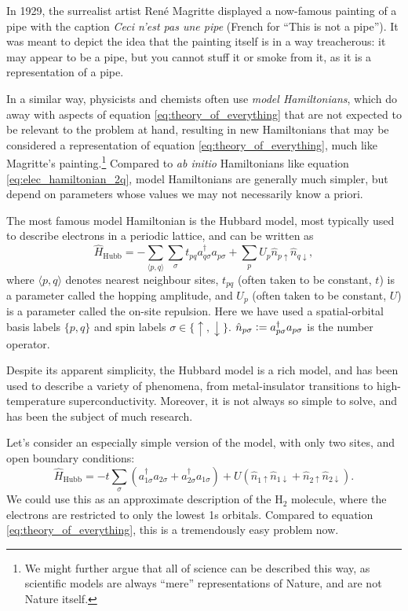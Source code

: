 In 1929, the surrealist artist Ren\'e Magritte displayed a now-famous painting of a pipe with the caption \emph{Ceci n'est pas une pipe} (French for ``This is not a pipe''). It was meant to depict the idea that the painting itself is in a way treacherous: it may appear to be a pipe, but you cannot stuff it or smoke from it, as it is a representation of a pipe.

In a similar way, physicists and chemists often use \emph{model Hamiltonians}, which do away with aspects of equation \ref{eq:theory_of_everything} that are not expected to be relevant to the problem at hand, resulting in new Hamiltonians that may be considered a representation of equation \ref{eq:theory_of_everything}, much like Magritte's painting.\footnote{We might further argue that all of science can be described this way, as scientific models are always ``mere'' representations of Nature, and are not Nature itself.} Compared to \emph{ab initio} Hamiltonians like equation \ref{eq:elec_hamiltonian_2q}, model Hamiltonians are generally much simpler, but depend on parameters whose values we may not necessarily know a priori.

The most famous model Hamiltonian is the Hubbard model,\cite{Hubbard1963} most typically used to describe electrons in a periodic lattice, and can be written as
\begin{equation}
\label{eq:hubbard}
\hat H_\mathrm{Hubb} = - \sum_{\langle p,q\rangle}\sum_\sigma t_{pq} a_{q\sigma}^\dag a_{p\sigma} + \sum_p U_p\hat n_{p\uparrow}\hat n_{q\downarrow},
\end{equation}
where $\langle p,q\rangle$ denotes nearest neighbour sites, $t_{pq}$ (often taken to be constant, $t$) is a parameter called the hopping amplitude, and $U_p$ (often taken to be constant, $U$) is a parameter called the on-site repulsion. Here we have used a spatial-orbital basis labels $\{p,q\}$ and spin labels $\sigma\in\{\uparrow,\downarrow\}$. $\hat n_{p\sigma}\mathrel{\mathop:}= a_{p\sigma}^\dag a_{p\sigma}$ is the number operator.

Despite its apparent simplicity, the Hubbard model is a rich model, and has been used to describe a variety of phenomena, from metal-insulator transitions to high-temperature superconductivity. Moreover, it is not always so simple to solve, and has been the subject of much research.\cite{Lieb1968a,liebermannFCIQMC2023}

Let's consider an especially simple version of the model, with only two sites, and open boundary conditions:
\begin{equation}
\label{eq:hubbard_h2}
\hat H_\mathrm{Hubb} = - t\sum_{\sigma}(a_{1\sigma}^\dag a_{2\sigma} + a_{2\sigma}^\dag a_{1\sigma}) + U(\hat n_{1\uparrow}\hat n_{1\downarrow}+\hat n_{2\uparrow}\hat n_{2\downarrow}).
\end{equation}
We could use this as an approximate description of the H$_2$ molecule, where the electrons are restricted to only the lowest 1s orbitals. Compared to equation \ref{eq:theory_of_everything}, this is a tremendously easy problem now.

